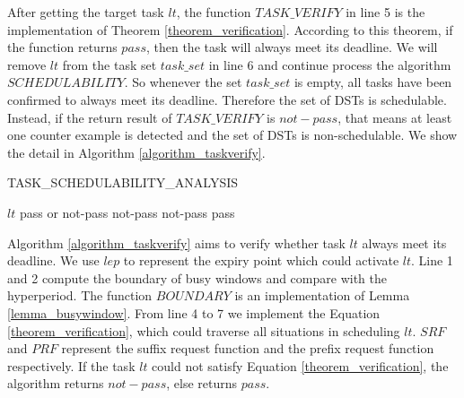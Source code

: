 \documentclass[sigconf]{acmart}
\begin{document}
After getting the target task $lt$, the function $TASK\_VERIFY$ in line 5 is the implementation of Theorem \ref{theorem_verification}. According to this theorem, if the function returns $pass$, then the task will always meet its deadline. We will remove $lt$ from the task set $task\_set$ in line 6 and continue process the algorithm $SCHEDULABILITY$. So whenever the set $task\_set$ is empty, all tasks have been confirmed to always meet its deadline. Therefore the set of DSTs is schedulable. Instead, if the return result of $TASK\_VERIFY$ is $not-pass$, that means at least one counter example is detected and the set of DSTs is non-schedulable. We show the detail in Algorithm \ref{algorithm_taskverify}.


\begin{algorithm}
  \caption{TASK\_SCHEDULABILITY\_ANALYSIS}
  \label{algorithm_taskverify}
  \begin{algorithmic}[1]
    \REQUIRE $lt$
    \ENSURE pass or not-pass
    \STATE \Return not-pass
    \ELSE
    \STATE \Return not-pass
    \ENDIF
    \ENDFOR
    \ENDFOR
    \ENDFOR
    \STATE \Return pass
    \ENDIF
  \end{algorithmic}
\end{algorithm}

Algorithm \ref{algorithm_taskverify} aims to verify whether task $lt$ always meet its deadline. We use $lep$ to represent the expiry point which could activate $lt$. Line 1 and 2 compute the boundary of busy windows and compare with the hyperperiod. The function $BOUNDARY$ is an implementation of Lemma \ref{lemma_busywindow}. From line 4 to 7 we implement the Equation \ref{theorem_verification}, which could traverse all situations in scheduling $lt$. $SRF$ and $PRF$ represent the suffix request function and the prefix request function respectively. If the task $lt$ could not satisfy Equation \ref{theorem_verification}, the algorithm returns $not-pass$, else returns $pass$.
\end{document}
